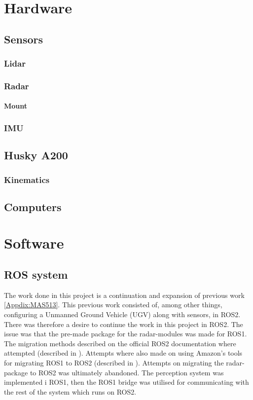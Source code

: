 \chapter{Hardware}
\section{Sensors}
\subsection{Lidar}

\subsection{Radar}
\subsubsection{Mount}
\subsection{IMU}
\section{Husky A200}
\subsection{Kinematics}
\section{Computers}


\chapter{Software}
\section{ROS system}
The work done in this project is a continuation and expansion of previous work \ref{Appdix:MAS513}. This previous work consisted of, among other things, configuring a Unmanned Ground Vehicle (UGV) along with sensors, in ROS2. There was therefore a desire to continue the work in this project in ROS2. The issue was that the pre-made package for the radar-modules was made for ROS1. The migration methods described on the official ROS2 documentation where attempted (described in \cite{ROSMigrationGuide}). Attempts where also made on using Amazon's tools for migrating ROS1 to ROS2 (described in \cite{ROSMigrationGuide}). Attempts on migrating the radar-package to ROS2 was ultimately abandoned. The perception system was implemented i ROS1, then the ROS1 bridge was utilised for communicating with the rest of the system which runs on ROS2.

